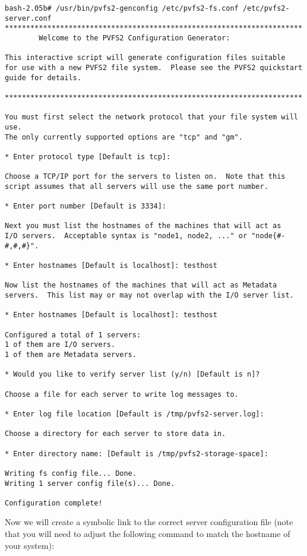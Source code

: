 \documentclass[11pt, letterpaper]{article}
\begin{document}
\begin{verbatim}
bash-2.05b# /usr/bin/pvfs2-genconfig /etc/pvfs2-fs.conf /etc/pvfs2-server.conf
**********************************************************************
        Welcome to the PVFS2 Configuration Generator:

This interactive script will generate configuration files suitable
for use with a new PVFS2 file system.  Please see the PVFS2 quickstart
guide for details.

**********************************************************************

You must first select the network protocol that your file system will use.
The only currently supported options are "tcp" and "gm".

* Enter protocol type [Default is tcp]: 

Choose a TCP/IP port for the servers to listen on.  Note that this
script assumes that all servers will use the same port number.

* Enter port number [Default is 3334]: 

Next you must list the hostnames of the machines that will act as
I/O servers.  Acceptable syntax is "node1, node2, ..." or "node{#-#,#,#}".

* Enter hostnames [Default is localhost]: testhost

Now list the hostnames of the machines that will act as Metadata
servers.  This list may or may not overlap with the I/O server list.

* Enter hostnames [Default is localhost]: testhost

Configured a total of 1 servers:
1 of them are I/O servers.
1 of them are Metadata servers.

* Would you like to verify server list (y/n) [Default is n]? 

Choose a file for each server to write log messages to.

* Enter log file location [Default is /tmp/pvfs2-server.log]: 

Choose a directory for each server to store data in.

* Enter directory name: [Default is /tmp/pvfs2-storage-space]: 

Writing fs config file... Done.
Writing 1 server config file(s)... Done.

Configuration complete!
\end{verbatim}

Now we will create a symbolic link to the correct server configuration file 
(note that you will need to adjust the following command to match the 
hostname of your system):
\end{document}
